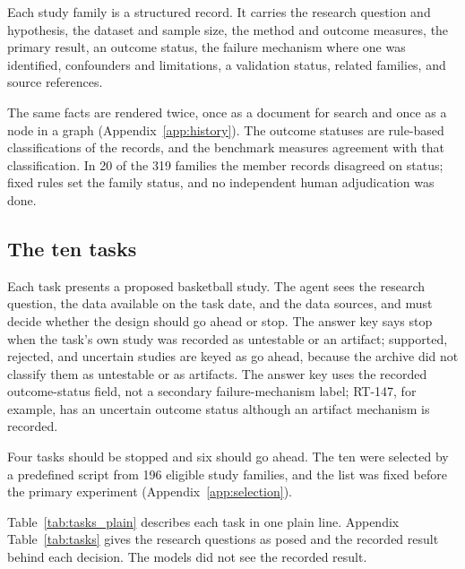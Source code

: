 \documentclass[11pt]{article}
\begin{document}
Each study family is a structured record. It carries the research question and hypothesis, the dataset and sample size, the method and outcome measures, the primary result, an outcome status, the failure mechanism where one was identified, confounders and limitations, a validation status, related families, and source references.

The same facts are rendered twice, once as a document for search and once as a node in a graph (Appendix~\ref{app:history}). The outcome statuses are rule-based classifications of the records, and the benchmark measures agreement with that classification. In 20 of the 319 families the member records disagreed on status; fixed rules set the family status, and no independent human adjudication was done.

\subsection{The ten tasks}
\label{sec:tasks}

Each task presents a proposed basketball study. The agent sees the research question, the data available on the task date, and the data sources, and must decide whether the design should go ahead or stop. The answer key says stop when the task's own study was recorded as untestable or an artifact; supported, rejected, and uncertain studies are keyed as go ahead, because the archive did not classify them as untestable or as artifacts. The answer key uses the recorded outcome-status field, not a secondary failure-mechanism label; RT-147, for example, has an uncertain outcome status although an artifact mechanism is recorded.

Four tasks should be stopped and six should go ahead. The ten were selected by a predefined script from 196 eligible study families, and the list was fixed before the primary experiment (Appendix~\ref{app:selection}).

Table~\ref{tab:tasks_plain} describes each task in one plain line. Appendix Table~\ref{tab:tasks} gives the research questions as posed and the recorded result behind each decision. The models did not see the recorded result.
\end{document}
